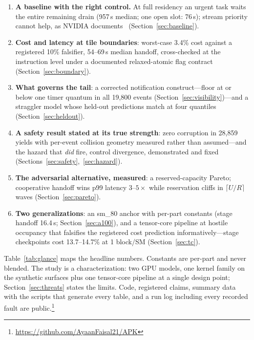 \documentclass[11pt]{article}
\newcommand{\us}{\,\textmu s\xspace}
\begin{document}
\begin{enumerate}
\item \textbf{A baseline with the right control.} At full residency
  an urgent task waits the entire remaining drain (957\us{} median;
  one open slot: 76\us); stream priority cannot help, as NVIDIA
  documents~\cite{cudart} (Section~\ref{sec:baseline}).
\item \textbf{Cost and latency at tile boundaries}: worst-case 3.4\%
  cost against a registered 10\% falsifier, 54--69\us{} median
  handoff, cross-checked at the instruction level under a documented
  relaxed-atomic flag contract (Section~\ref{sec:boundary}).
\item \textbf{What governs the tail}: a corrected notification
  construct---floor at or below one timer quantum in all 19{,}800
  events (Section~\ref{sec:visibility})---and a straggler model
  whose held-out predictions match at four quantiles
  (Section~\ref{sec:heldout}).
\item \textbf{A safety result stated at its true strength}: zero
  corruption in 28{,}859 yields with per-event collision geometry
  measured rather than assumed---and the hazard that \emph{did}
  fire, control divergence, demonstrated and fixed
  (Sections~\ref{sec:safety},~\ref{sec:hazard}).
\item \textbf{The adversarial alternative, measured}: a
  reserved-capacity Pareto; cooperative handoff wins p99 latency
  $3$--$5\times$ while reservation cliffs in $\lceil U/R \rceil$
  waves (Section~\ref{sec:pareto}).
\item \textbf{Two generalizations}: an sm\_80 anchor with per-part
  constants (stage handoff 16.4\us; Section~\ref{sec:a100}), and a
  tensor-core pipeline at hostile occupancy that falsifies the
  registered cost prediction informatively---stage checkpoints cost
  13.7--14.7\% at 1 block/SM (Section~\ref{sec:tc}).
\end{enumerate}

Table~\ref{tab:glance} maps the headline numbers. Constants are
per-part and never blended. The study is a characterization: two GPU
models, one kernel family on the synthetic surfaces plus one
tensor-core pipeline at a single design point;
Section~\ref{sec:threats} states the limits. Code, registered claims,
summary data with the scripts that generate every table, and a run
log including every recorded fault are
public.\footnote{\url{https://github.com/AyaanFaisal21/APK}}
\end{document}
